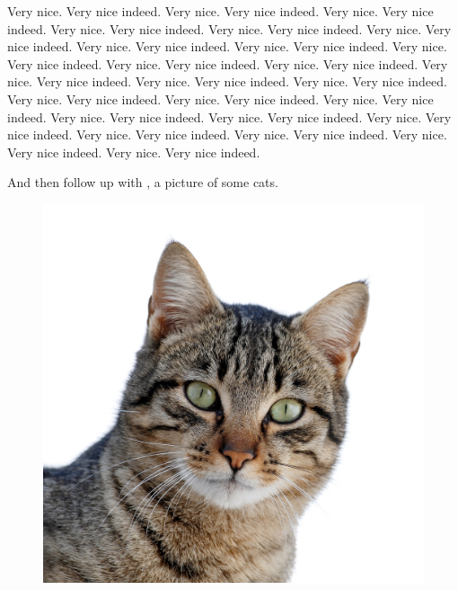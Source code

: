 \documentclass[12pt]{report}
\begin{document}
Very nice. Very nice indeed. Very nice. Very nice indeed. Very nice. Very nice indeed. Very nice. Very nice indeed. Very nice. Very nice indeed. Very nice. Very nice indeed. Very nice. Very nice indeed. Very nice. Very nice indeed. Very nice. Very nice indeed. Very nice. Very nice indeed. Very nice. Very nice indeed. Very nice. Very nice indeed. Very nice. Very nice indeed. Very nice. Very nice indeed. Very nice. Very nice indeed. Very nice. Very nice indeed. Very nice. Very nice indeed. Very nice. Very nice indeed. Very nice. Very nice indeed. Very nice. Very nice indeed. Very nice. Very nice indeed. Very nice. Very nice indeed. Very nice. Very nice indeed. Very nice. Very nice indeed.

And then follow up with \label{cats}, a picture of some cats.

\begin{figure}[htbp]
\begin{center}
\includegraphics[height=.08\textheight]{cat.jpg}

\end{center}
\end{figure}
\end{document}
